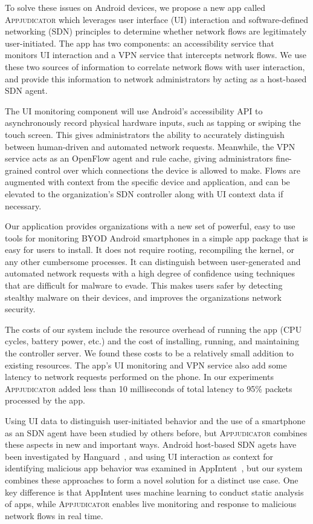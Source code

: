 
To solve these issues on Android devices, we propose a new app called
\textsc{Appjudicator} which leverages user interface (UI) interaction and
software-defined networking (SDN) principles to determine whether network flows
are legitimately user-initiated. The app has two components: an accessibility
service that monitors UI interaction and a VPN service that intercepts network
flows. We use these two sources of information to correlate network flows with
user interaction, and provide this information to network administrators by
acting as a host-based SDN agent.

The UI monitoring component will use Android's accessibility API to
asynchronously record physical hardware inputs, such as tapping or swiping the
touch screen. This gives administrators the ability to accurately distinguish
between human-driven and automated network requests. Meanwhile, the VPN service
acts as an OpenFlow agent and rule cache, giving administrators fine-grained
control over which connections the device is allowed to make. Flows are
augmented with context from the specific device and application, and can be
elevated to the organization's SDN controller along with UI context data if
necessary.


Our application provides organizations with a new set of powerful, easy to use
tools for monitoring BYOD Android smartphones in a simple app package that is
easy for users to install. It does not require rooting, recompiling the kernel,
or any other cumbersome processes. It can distinguish between user-generated and
automated network requests with a high degree of confidence using techniques
that are difficult for malware to evade. This makes users safer by detecting
stealthy malware on their devices, and improves the organizations network
security.

The costs of our system include the resource overhead of running the app (CPU
cycles, battery power, etc.) and the cost of installing, running, and
maintaining the controller server. We found these costs to be a relatively
small addition to existing resources. The app's UI monitoring and VPN service
also add some latency to network requests performed on the phone. In our
experiments \textsc{Appjudicator} added less than 10 milliseconds of total
latency to 95\% packets processed by the app.


Using UI data to distinguish user-initiated behavior and the use of a smartphone
as an SDN agent have been studied by others before, but \textsc{Appjudicator}
combines these aspects in new and important ways. Android host-based SDN agets
have been investigated by Hanguard~\cite{demetriou2017}, and using UI
interaction as context for identifying malicious app behavior was examined in
AppIntent~\cite{yang2013}, but our system combines these approaches to form a
novel solution for a distinct use case. One key difference is that AppIntent
uses machine learning to conduct static analysis of apps, while
\textsc{Appjudicator} enables live monitoring and response to malicious network
flows in real time.

